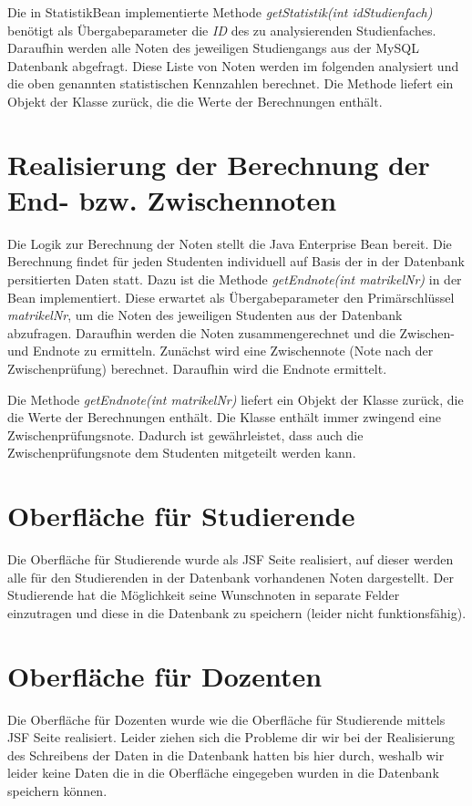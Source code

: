 \documentclass[12pt,a4paper,parskip]{scrreprt}
\begin{document}
Die in StatistikBean implementierte Methode \textit{getStatistik(int idStudienfach)} benötigt als Übergabeparameter die \textit{ID} des zu analysierenden Studienfaches. Daraufhin werden alle Noten des jeweiligen Studiengangs aus der MySQL Datenbank abgefragt. Diese Liste von Noten werden im folgenden analysiert und die oben genannten statistischen Kennzahlen berechnet. Die Methode liefert ein Objekt der Klasse  zurück, die die Werte der Berechnungen enthält.

\section{Realisierung der Berechnung der End- bzw. Zwischennoten}

Die Logik zur Berechnung der Noten stellt die Java Enterprise Bean  bereit. Die Berechnung findet für jeden Studenten individuell auf Basis der in der Datenbank persitierten Daten statt. 
Dazu ist die Methode \textit{getEndnote(int matrikelNr)} in der Bean implementiert. Diese erwartet als Übergabeparameter den Primärschlüssel \textit{matrikelNr}, um die Noten des jeweiligen Studenten aus der Datenbank abzufragen. Daraufhin werden die Noten zusammengerechnet und die Zwischen- und Endnote zu ermitteln.
Zunächst wird eine Zwischennote (Note nach der Zwischenprüfung) berechnet. Daraufhin wird die Endnote ermittelt.

Die Methode \textit{getEndnote(int matrikelNr)} liefert ein Objekt der Klasse  zurück, die die Werte der Berechnungen enthält. Die Klasse  enthält immer zwingend eine Zwischenprüfungsnote. Dadurch ist gewährleistet, dass auch die Zwischenprüfungsnote dem Studenten mitgeteilt werden kann.

\section{Oberfläche für Studierende}
Die Oberfläche für Studierende wurde als JSF Seite realisiert, auf dieser werden alle für den Studierenden in der Datenbank vorhandenen Noten dargestellt. Der Studierende hat die Möglichkeit seine Wunschnoten in separate Felder einzutragen und diese in die Datenbank zu speichern (leider nicht funktionsfähig).
\section{Oberfläche für Dozenten}
Die Oberfläche für Dozenten wurde wie die Oberfläche für Studierende mittels JSF Seite realisiert. Leider ziehen sich die Probleme dir wir bei der Realisierung des Schreibens der Daten in die Datenbank hatten bis hier durch, weshalb wir leider keine Daten die in die Oberfläche eingegeben wurden in die Datenbank speichern können.
\end{document}
